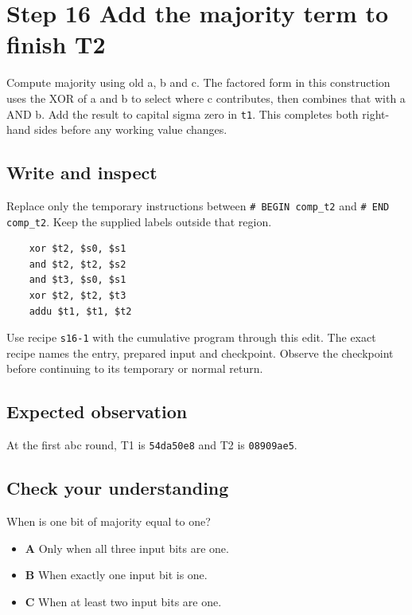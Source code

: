 \section{Step 16 Add the majority term to finish T2}\label{sha-s16}

Compute majority using old a, b and c. The factored form in this construction uses the XOR of a and b to select where c contributes, then combines that with a AND b. Add the result to capital sigma zero in \texttt{t1}. This completes both right-hand sides before any working value changes.

\subsection{Write and inspect}
Replace only the temporary instructions between \texttt{\# BEGIN comp\_t2} and \texttt{\# END comp\_t2}. Keep the supplied labels outside that region.

\begin{verbatim}
    xor $t2, $s0, $s1
    and $t2, $t2, $s2
    and $t3, $s0, $s1
    xor $t2, $t2, $t3
    addu $t1, $t1, $t2
\end{verbatim}

Use recipe \texttt{s16-1} with the cumulative program through this edit. The exact recipe names the entry, prepared input and checkpoint. Observe the checkpoint before continuing to its temporary or normal return.

\subsection{Expected observation}
At the first abc round, T1 is \texttt{54da50e8} and T2 is \texttt{08909ae5}.

\subsection{Check your understanding}
When is one bit of majority equal to one?

\begin{itemize}
\item \textbf{A} Only when all three input bits are one.
\item \textbf{B} When exactly one input bit is one.
\item \textbf{C} When at least two input bits are one.
\end{itemize}
